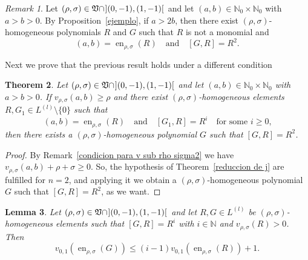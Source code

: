 \documentclass[reqno,a4paper]{amsart}
\newtheorem{theorem}{Theorem}[section]
\newtheorem{lemma}[theorem]{Lemma}
\theoremstyle{definition}
\theoremstyle{remark}
\newtheorem{remark}[theorem]{Remark}
\DeclareMathOperator{\en}{en}
\begin{document}
\begin{remark} Let $(\rho,\sigma)\in\mathfrak{V}\cap \hspace{0.7pt}](0,-1),(1,-1)[\hspace{0.7pt}$ and let $(a,b)\in \mathds{N}_0\times \mathds{N}_0$ with $a>b>0$. By Proposition~\ref{ejemplo}, if $a>2b$, then there exist $(\rho,\sigma)$-homogeneous polynomials $R$ and $G$ such that $R$ is not a mono\-mial and
$$
(a,b)=\en_{\rho,\sigma}(R)\quad\text{and}\quad [G,R]= R^2.
$$
\end{remark}

Next we prove that the previous result holds under a different condition

\begin{theorem}\label{condicion principal} Let $(\rho,\sigma)\in\mathfrak{V}\cap \hspace{0.7pt}](0,-1),(1,-1)[\hspace{0.7pt}$ and let $(a,b)\in \mathds{N}_0\times \mathds{N}_0$ with $a>b>0$. If $v_{\rho,\sigma}(a,b)\ge \rho$ and there exist $(\rho,\sigma)$-ho\-mogeneous elements $R,G_1\in L^{(l)}\setminus\{0\}$
such that
\begin{equation*}%
(a,b)=\en_{\rho,\sigma}(R)\quad \text{and}\quad [G_1,R]= R^i\quad \text{for some $i\ge 0$,}
\end{equation*}
then there exists a $(\rho,\sigma)$-homogeneous polynomial $G$ such that $[G,R]= R^2$.
\end{theorem}

\begin{proof} By Remark~\ref{condicion para v sub rho sigma2} we have $v_{\rho,\sigma}(a,b)+\rho+\sigma\ge 0$. So, the hypothesis of Theorem~\ref{reduccion de j} are fulfilled for $n=2$, and applying it we obtain a $(\rho,\sigma)$-homogeneous polynomial $G$ such that $[G,R]= R^2$, as we want.
\end{proof}

\begin{lemma}\label{maximo grado} Let $(\rho,\sigma)\in\mathfrak{V}\cap \hspace{0.7pt}](0,-1),(1,-1)[\hspace{0.7pt}$ and let $R,G\in L^{(l)}$ be $(\rho,\sigma)$-homogeneous elements such that $[G,R]= R^i$ with $i\in\mathds{N}$ and $v_{\rho,\sigma}(R)>0$. Then
\begin{equation}\label{eq1}
v_{0,1}(\en_{\rho,\sigma}(G))\le (i-1)v_{0,1}(\en_{\rho,\sigma}(R))+1.
\end{equation}
\end{lemma}
\end{document}
